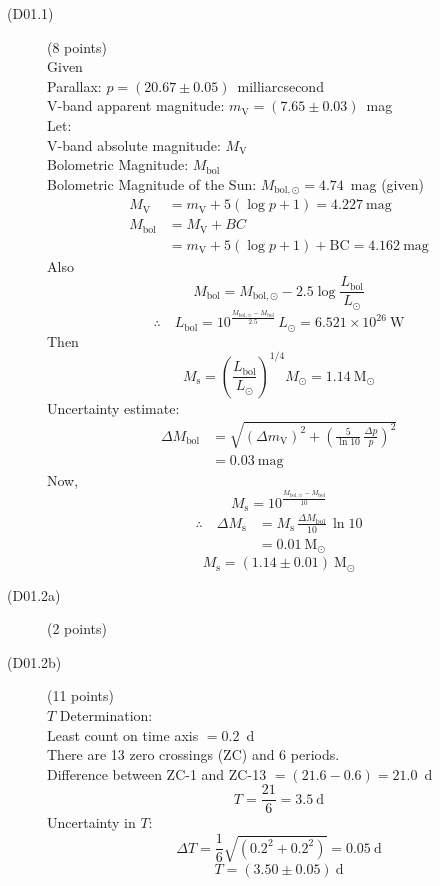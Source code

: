 \begin{description}
\item[(D01.1)] \hfill(8 points)\\
Given\\
Parallax: $p = (20.67\pm0.05)$~milliarcsecond\\
V-band apparent magnitude: $m_{\mathrm{V}} = (7.65\pm0.03)$~mag\\
Let:\\
V-band absolute magnitude: $M_{\mathrm{V}}$\\
Bolometric Magnitude: $M_{\mathrm{bol}}$\\
Bolometric Magnitude of the Sun: $M_{\mathrm{bol},\odot} = 4.74$~mag (given)
\begin{align*}
M_{\mathrm{V}} &= m_{\mathrm{V}} + 5(\log p + 1) = 4.227\ \mathrm{mag}\\
M_{\mathrm{bol}} &= M_{\mathrm{V}} + BC\\
  &= m_{\mathrm{V}} + 5(\log p + 1) + \mathrm{BC} = 4.162\ \mathrm{mag}
\end{align*}
Also
\[ M_{\mathrm{bol}} = M_{\mathrm{bol},\odot} - 2.5\log\frac{L_{\mathrm{bol}}}{L_\odot} \]
\[ \therefore\quad L_{\mathrm{bol}}
   = 10^{\frac{M_{\mathrm{bol},\odot}-M_{\mathrm{bol}}}{2.5}}\,L_\odot
   = 6.521\times10^{26}\ \mathrm{W} \]
Then
\[ M_{\mathrm{s}} = \left(\frac{L_{\mathrm{bol}}}{L_\odot}\right)^{1/4} M_\odot
   = 1.14\ \mathrm{M_\odot} \]
Uncertainty estimate:
\begin{align*}
\Delta M_{\mathrm{bol}} &= \sqrt{(\Delta m_{\mathrm{V}})^2
  + \left(\frac{5}{\ln 10}\,\frac{\Delta p}{p}\right)^2}\\
  &= 0.03\ \mathrm{mag}
\end{align*}
Now,
\[ M_{\mathrm{s}} = 10^{\frac{M_{\mathrm{bol},\odot}-M_{\mathrm{bol}}}{10}} \]
\begin{align*}
\therefore\quad \Delta M_{\mathrm{s}}
  &= M_{\mathrm{s}}\,\frac{\Delta M_{\mathrm{bol}}}{10}\,\ln 10\\
  &= 0.01\ \mathrm{M_\odot}
\end{align*}
\[ \boxed{M_{\mathrm{s}} = (1.14\pm0.01)\ \mathrm{M_\odot}} \]

\item[(D01.2a)] \hfill(2 points)\\

\item[(D01.2b)] \hfill(11 points)\\
$T$ Determination:\\
Least count on time axis $= 0.2$~d\\
There are 13 zero crossings (ZC) and 6 periods.\\
Difference between ZC-1 and ZC-13 $= (21.6-0.6) = 21.0$~d
\[ T = \frac{21}{6} = 3.5\ \mathrm{d} \]
Uncertainty in $T$:
\[ \Delta T = \frac{1}{6}\sqrt{(0.2^2+0.2^2)} = 0.05\ \mathrm{d} \]
\[ \boxed{T = (3.50\pm0.05)\ \mathrm{d}} \]


\end{description}
